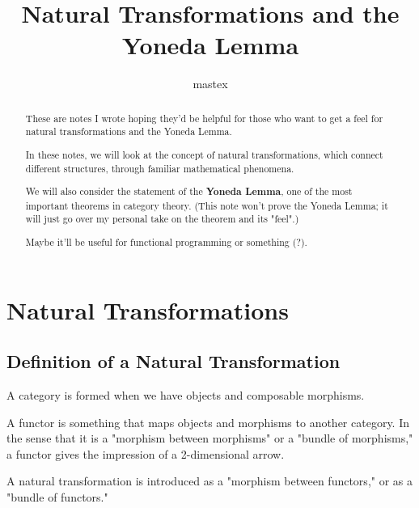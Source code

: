 \documentclass[uplatex,a4j,12pt,dvipdfmx]{jsarticle}
\title{
\textbf{Natural Transformations and the Yoneda Lemma}
}
\author{
mastex
}
\begin{document}
\maketitle

\begin{abstract}
	These are notes I wrote hoping they'd be helpful for those who want to get a feel for natural transformations and the Yoneda Lemma.

	In these notes, we will look at the concept of natural transformations, which connect different structures, through familiar mathematical phenomena.

	We will also consider the statement of the \textbf{Yoneda Lemma}, one of the most important theorems in category theory.
	(This note won't prove the Yoneda Lemma; it will just go over my personal take on the theorem and its "feel".)

	Maybe it'll be useful for functional programming or something (?).


\end{abstract}

\section{Natural Transformations}

\subsection{Definition of a Natural Transformation}

A category is formed when we have objects and composable morphisms.

A functor is something that maps objects and morphisms to another category.
In the sense that it is a "morphism between morphisms" or a "bundle of morphisms," a functor gives the impression of a 2-dimensional arrow.

A natural transformation is introduced as a "morphism between functors," or as a "bundle of functors."
\end{document}
